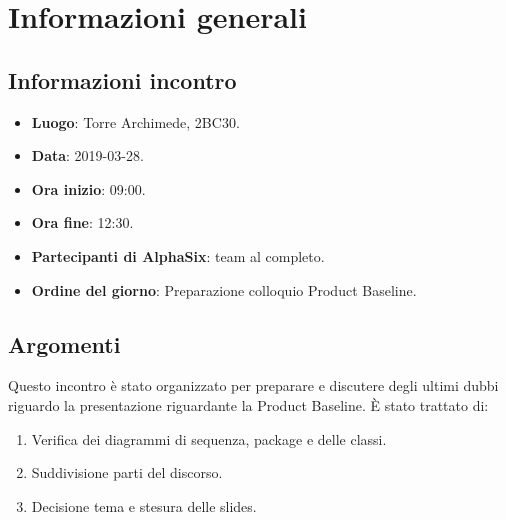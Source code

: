 \newcommand{\documento}{\VI}
\newcommand{\nomedocumentofisico}{VI\_2019-03-28.pdf}
\newcommand{\redazione}{\SG}
\newcommand{\verifica}{\CV}
\newcommand{\approvazione}{\NC}
\newcommand{\versione}{1.0.0}
\newcommand{\uso}{Interno}
\newcommand{\destinateTo}{\gruppo}
\newcommand{\datacreazione}{29 marzo 2019}
\newcommand{\datamodifica}{31 marzo 2019}
\newcommand{\stato}{Approvato}

\def\TABELLE{false}	%
\def\FIGURE{false} 	%






    

    	
    
    \section{Informazioni generali}
		\subsection{Informazioni incontro}
			\begin{itemize}
				\item \textbf{Luogo}: Torre Archimede, 2BC30.
				\item \textbf{Data}: 2019-03-28.
				\item \textbf{Ora inizio}: 09:00.
				\item \textbf{Ora fine}: 12:30.
				\item \textbf{Partecipanti di AlphaSix}: team al completo.
				\item \textbf{Ordine del giorno}: Preparazione colloquio Product Baseline.
			\end{itemize}

        \subsection{Argomenti}
            Questo incontro è stato organizzato per preparare e discutere degli ultimi dubbi riguardo la presentazione riguardante la Product Baseline. È stato trattato di:
            \begin{enumerate}
                \item Verifica dei diagrammi di sequenza, package e delle classi.
                \item Suddivisione parti del discorso.
                \item Decisione tema e stesura delle slides.
            \end{enumerate}
            
